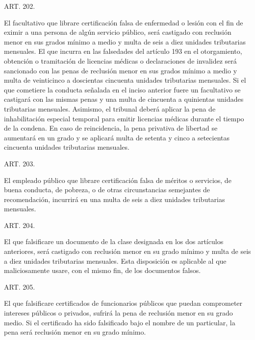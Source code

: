     ART. 202.

    El facultativo que librare certificación falsa de enfermedad o lesión con el fin de eximir a una persona de algún servicio público, será castigado con reclusión menor en sus grados mínimo a medio y multa de seis a diez unidades tributarias mensuales.
    El que incurra en las falsedades del artículo 193 en el otorgamiento, obtención o tramitación de licencias médicas o declaraciones de invalidez será sancionado con las penas de reclusión menor en sus grados mínimo a medio y multa de veinticinco a doscientas cincuenta unidades tributarias mensuales.
    Si el que cometiere la conducta señalada en el inciso anterior fuere un facultativo se castigará con las mismas penas y una multa de cincuenta a quinientas unidades tributarias mensuales. Asimismo, el tribunal deberá aplicar la pena de inhabilitación especial temporal para emitir licencias médicas durante el tiempo de la condena.
    En caso de reincidencia, la pena privativa de libertad se aumentará en un grado y se aplicará multa de setenta y cinco a setecientas cincuenta unidades tributarias mensuales.









    ART. 203.

    El empleado público que librare certificación falsa de méritos o servicios, de buena conducta, de pobreza, o de otras circunstancias semejantes de recomendación, incurrirá en una multa de seis a diez unidades tributarias mensuales.









    ART. 204.

    El que falsificare un documento de la clase designada en los dos artículos anteriores, será castigado con reclusión menor en su grado mínimo y multa de seis a diez unidades tributarias mensuales.
    Esta disposición es aplicable al que maliciosamente usare, con el mismo fin, de los documentos falsos.





    ART. 205.

    El que falsificare certificados de funcionarios públicos que puedan comprometer intereses públicos o privados, sufrirá la pena de reclusión menor en su grado medio.
    Si el certificado ha sido falsificado bajo el nombre de un particular, la pena será reclusión menor en su grado mínimo.


